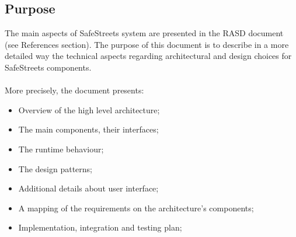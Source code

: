 \documentclass{article}
\begin{document}
		\subsection{Purpose}
		The main aspects of SafeStreets system are presented in the RASD document (see References section). The purpose of this document is to describe in a more detailed way the technical aspects regarding architectural and design choices for SafeStreets components.\\\\
		More precisely, the document presents:
		\begin{itemize}
			\item Overview of the high level architecture;
			\item The main components, their interfaces; 
			\item The runtime behaviour; 
			\item The design patterns;
			\item Additional details about user interface;
			\item A mapping of the requirements on the architecture's components;
			\item Implementation, integration and testing plan;

		\end{itemize}
\end{document}
